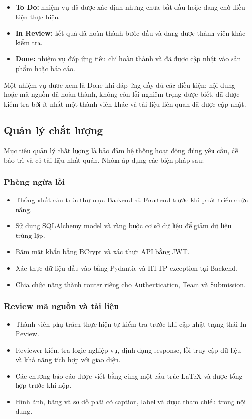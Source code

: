 \begin{itemize}
    \item \textbf{To Do:} nhiệm vụ đã được xác định nhưng chưa bắt đầu hoặc đang chờ điều kiện thực hiện.
    \item \textbf{In Review:} kết quả đã hoàn thành bước đầu và đang được thành viên khác kiểm tra.
    \item \textbf{Done:} nhiệm vụ đáp ứng tiêu chí hoàn thành và đã được cập nhật vào sản phẩm hoặc báo cáo.
\end{itemize}

Một nhiệm vụ được xem là Done khi đáp ứng đầy đủ các điều kiện: nội dung hoặc mã nguồn đã hoàn thành, không còn lỗi nghiêm trọng được biết, đã được kiểm tra bởi ít nhất một thành viên khác và tài liệu liên quan đã được cập nhật.

\subsection{Quản lý chất lượng}

Mục tiêu quản lý chất lượng là bảo đảm hệ thống hoạt động đúng yêu cầu, dễ bảo trì và có tài liệu nhất quán. Nhóm áp dụng các biện pháp sau:

\subsubsection{Phòng ngừa lỗi}

\begin{itemize}
    \item Thống nhất cấu trúc thư mục Backend và Frontend trước khi phát triển chức năng.
    \item Sử dụng SQLAlchemy model và ràng buộc cơ sở dữ liệu để giảm dữ liệu trùng lặp.
    \item Băm mật khẩu bằng BCrypt và xác thực API bằng JWT.
    \item Xác thực dữ liệu đầu vào bằng Pydantic và HTTP exception tại Backend.
    \item Chia chức năng thành router riêng cho Authentication, Team và Submission.
\end{itemize}

\subsubsection{Review mã nguồn và tài liệu}

\begin{itemize}
    \item Thành viên phụ trách thực hiện tự kiểm tra trước khi cập nhật trạng thái In Review.
    \item Reviewer kiểm tra logic nghiệp vụ, định dạng response, lỗi truy cập dữ liệu và khả năng tích hợp với giao diện.
    \item Các chương báo cáo được viết bằng cùng một cấu trúc LaTeX và được tổng hợp trước khi nộp.
    \item Hình ảnh, bảng và sơ đồ phải có caption, label và được tham chiếu trong nội dung.
\end{itemize}

